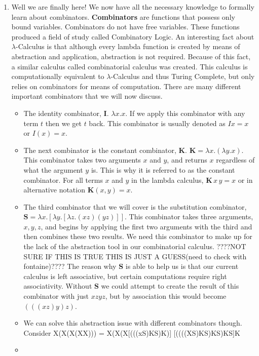 \documentclass[12pt]{article}
\begin{document}
\begin{enumerate}
\item Well we are finally here! We now have all the necessary knowledge to formally learn about combinators. \textbf{Combinators} are functions that possess only bound variables. Combinators do not have free variables. These functions produced a field of study called Combinatory Logic. An interesting fact about $\lambda$-Calculus is that although every lambda function is created by means of abstraction and application, abstraction is not required. Because of this fact, a similar calculus called combinatorial calculus was created. This calculus is computationally equivalent to $\lambda$-Calculus and thus Turing Complete, but only relies on combinators for means of computation. There are many different important combinators that we will now discuss.
\begin{itemize}
\item The identity combinator, $\mathbf{I}$. $\lambda x.x$. If we apply this combinator with any term $t$ then we get $t$ back. This combinator is usually denoted as $I x = x$ or $I(x) = x$.
\item The next combinator is the constant combinator, $\mathbf{K}$. $\mathbf{K} = \lambda x.(\lambda y.x)$. This combinator takes two arguments $x$ and $y$, and returns $x$ regardless of what the argument $y$ is. This is why it is referred to as the constant combinator. For all terms $x$ and $y$ in the lambda calculus, $\mathbf{K}\,x\,y = x$ or in alternative notation $\mathbf{K}(x,y) = x$.
\item The third combinator that we will cover is the substitution combinator, $\mathbf{S} = \lambda x.[\lambda y.[\lambda z.(xz)(yz)]]$. This combinator takes three arguments,$x,y,z$, and begins by applying the first two arguments with the third and then combines these two results. We need this combinator to make up for the lack of the abstraction tool in our combinatorial calculus. ????NOT SURE IF THIS IS TRUE THIS IS JUST A GUESS(need to check with fontaine)???? The reason why \textbf{S} is able to help us is that our current calculus is left associative, but certain computations require right associativity. Without \textbf{S} we could attempt to create the result of this combinator with just $xzyz$, but by association this would become $(((xz)y)z)$.
\item We can solve this abstraction issue with different combinators though. Consider X(X(X(XX))) = X(X(X[(((xS)KS)K)]
[((((XS)KS)KS)KS]K

\item
\begin{center}


\end{center}
\end{itemize}


\end{enumerate}
\end{document}
